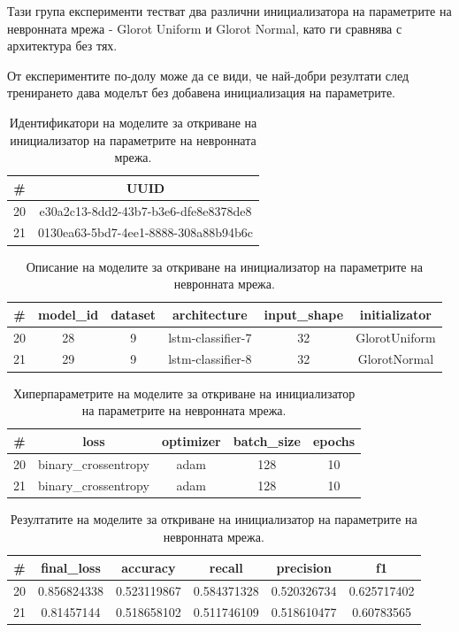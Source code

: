 \documentclass{article}
\begin{document}
Тази група експерименти тестват два различни инициализатора на параметрите на невронната мрежа - Glorot Uniform и
Glorot Normal, като ги сравнява с архитектура без тях.

От експериментите по-долу може да се види, че най-добри резултати след тренирането дава моделът без добавена
инициализация на параметрите.

\begin{table}[H]
\centering
\captionsetup{justification=centering}
\begin{tabular}{|c||c|}
\hline
\# & UUID\\
\hline
20 & e30a2c13-8dd2-43b7-b3e6-dfe8e8378de8\\
21 & 0130ea63-5bd7-4ee1-8888-308a88b94b6c\\
\hline
\end{tabular}
\caption{Идентификатори на моделите за откриване на инициализатор на параметрите на невронната мрежа.}
\end{table}

\begin{table}[H]
\centering
\captionsetup{justification=centering}
\begin{tabular}{|c||c|c|c|c|c|}
\hline
\# & model\_id & dataset & architecture & input\_shape & initializator\\
\hline
20 & 28 & 9 & lstm-classifier-7 & 32 & GlorotUniform\\
21 & 29 & 9 & lstm-classifier-8 & 32 & GlorotNormal\\
\hline
\end{tabular}
\caption{Описание на моделите за откриване на инициализатор на параметрите на невронната мрежа.}
\end{table}

\begin{table}[H]
\centering
\captionsetup{justification=centering}
\begin{tabular}{|c||c|c|c|c|}
\hline
\# & loss & optimizer & batch\_size & epochs\\
\hline
20 & binary\_crossentropy & adam & 128 & 10\\
21 & binary\_crossentropy & adam & 128 & 10\\
\hline
\end{tabular}
\caption{Хиперпараметрите на моделите за откриване на инициализатор на параметрите на невронната мрежа.}
\end{table}

\begin{table}[H]
\centering
\captionsetup{justification=centering}
\begin{tabular}{|c||c|c|c|c|c|}
\hline
\# & final\_loss & accuracy & recall & precision & f1\\
\hline
20 & 0.856824338 & 0.523119867 & 0.584371328 & 0.520326734 & 0.625717402\\
21 & 0.81457144 & 0.518658102 & 0.511746109 & 0.518610477 & 0.60783565\\
\hline
\end{tabular}
\caption{Резултатите на моделите за откриване на инициализатор на параметрите на невронната мрежа.}
\end{table}
\end{document}
